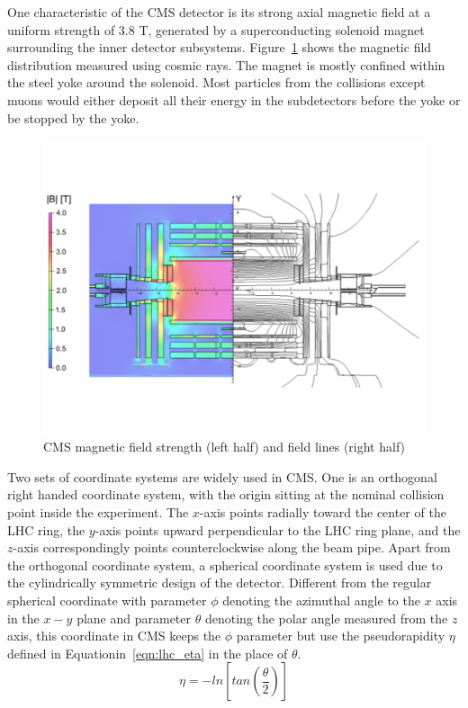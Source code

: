\vspace{0.3cm}
One characteristic of the CMS detector is its strong axial magnetic field at a uniform strength of 3.8 T, generated by a superconducting solenoid magnet surrounding the inner detector subsystems. Figure~\ref{fig:lhc_magnetdistr} shows the magnetic fild distribution measured using cosmic rays\cite{lhc_magnetmap}. The magnet is mostly confined within the steel yoke around the solenoid. Most particles from the collisions except muons would either deposit all their energy in the subdetectors before the yoke or be stopped by the yoke.
\begin{figure}[htbp]
\begin{center}
\includegraphics[width=0.7\linewidth, page=1]{figures/lhc_magnetdistr.pdf}
\caption{CMS magnetic field strength (left half) and field lines (right half)}
\label{fig:lhc_magnetdistr}
\end{center}
\end{figure}

\vspace{0.3cm}
Two sets of coordinate systems are widely used in CMS. One is an orthogonal right handed coordinate system, with the origin sitting at the nominal collision point inside the experiment. The $x$-axis points radially toward the center of the LHC ring, the $y$-axis points upward perpendicular to the LHC ring plane, and the $z$-axis correspondingly points counterclockwise along the beam pipe. Apart from the orthogonal coordinate system, a spherical coordinate system is used due to the cylindrically symmetric design of the detector. Different from the regular spherical coordinate with parameter $\phi$ denoting the azimuthal angle to the $x$ axis in the $x-y$ plane and parameter $\theta$ denoting the polar angle measured from the $z$ axis, this coordinate in CMS keeps the $\phi$ parameter but use the pseudorapidity $\eta$ defined in Equationin~\ref{eqn:lhc_eta} in the place of $\theta$.
\begin{equation}
\eta = -ln[tan(\frac{\theta}{2})]
\label{eqn:lhc_eta}
\end{equation}

